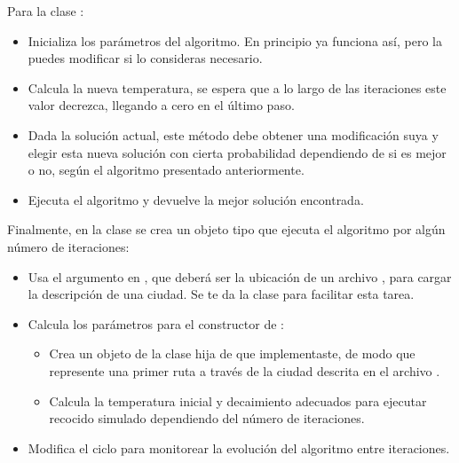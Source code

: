 Para la clase :
\begin{itemize}
 \item {}
 
 Inicializa los parámetros del algoritmo. En principio ya funciona así, pero la puedes modificar si lo consideras necesario.
 
 \item {}
 
 Calcula la nueva temperatura, se espera que a lo largo de las iteraciones este valor decrezca, llegando a cero en el último paso.
 
 \item {}
 
 Dada la solución actual, este método debe obtener una modificación suya y elegir esta nueva solución con cierta probabilidad dependiendo de si es mejor o no, según el algoritmo presentado anteriormente.
 
 \item {}
 
 Ejecuta el algoritmo y devuelve la mejor solución encontrada.
\end{itemize}

Finalmente, en la clase  se crea un objeto tipo  que ejecuta el algoritmo por algún número de iteraciones:

\begin{itemize}
 \item Usa el argumento en , que deberá ser la ubicación de un archivo , para cargar la descripción de una ciudad.  Se te da la clase  para facilitar esta tarea.

 \item Calcula los parámetros para el constructor de :
 
 \begin{itemize}
  \item Crea un objeto de la clase hija de  que implementaste, de modo que represente una primer ruta a través de la ciudad descrita en el archivo .
  
  \item Calcula la temperatura inicial y decaimiento adecuados para ejecutar recocido simulado dependiendo del número de iteraciones.
 \end{itemize}

 \item Modifica el ciclo para monitorear la evolución del algoritmo entre iteraciones.
\end{itemize}


